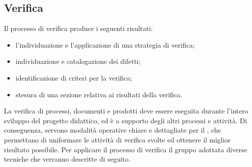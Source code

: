 \documentclass[12pt,a4paper]{article}
\begin{document}
\subsection{Verifica} %
Il processo di verifica produce i seguenti risultati:
\begin{itemize}
  \item l'individuazione e l'applicazione di una strategia di verifica;
  \item individuazione e catalogazione dei difetti;
  \item identificazione di criteri per la verifica;
  \item stesura di una sezione relativa ai risultati della verifica.
\end{itemize}
La verifica di processi, documenti e prodotti deve essere eseguita durante l'intero sviluppo del progetto didattico, ed è a supporto degli altri processi e attività. Di conseguenza, servono modalità operative chiare e dettagliate per il \VR, che permettano di uniformare le attività di verifica svolte ed ottenere il miglior risultato possibile. Per applicare il processo di verifica il gruppo adottata diverse tecniche che verranno descritte di seguito.
\end{document}
